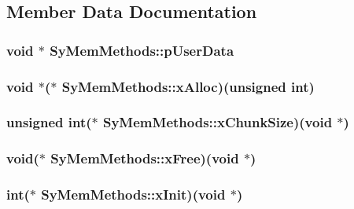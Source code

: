 \subsection{Member Data Documentation}
\hypertarget{struct_sy_mem_methods_ab71115d9f01d99699680465a58f2574b}{
\subsubsection[{p\-User\-Data}]{\setlength{\rightskip}{0pt plus 5cm}void $\ast$ Sy\-Mem\-Methods\-::p\-User\-Data}}\label{de/d5d/struct_sy_mem_methods_ab71115d9f01d99699680465a58f2574b}
\hypertarget{struct_sy_mem_methods_a0c07173c42658f654805a2b5a00fb470}{
\subsubsection[{x\-Alloc}]{\setlength{\rightskip}{0pt plus 5cm}void $\ast$($\ast$ Sy\-Mem\-Methods\-::x\-Alloc)(unsigned int)}}\label{de/d5d/struct_sy_mem_methods_a0c07173c42658f654805a2b5a00fb470}
\hypertarget{struct_sy_mem_methods_acab2915281ea3495d9b728f1f878554a}{
\subsubsection[{x\-Chunk\-Size}]{\setlength{\rightskip}{0pt plus 5cm}unsigned int($\ast$ Sy\-Mem\-Methods\-::x\-Chunk\-Size)(void $\ast$)}}\label{de/d5d/struct_sy_mem_methods_acab2915281ea3495d9b728f1f878554a}
\hypertarget{struct_sy_mem_methods_a17727c244d441b82fdef13f1f3a333cf}{
\subsubsection[{x\-Free}]{\setlength{\rightskip}{0pt plus 5cm}void($\ast$ Sy\-Mem\-Methods\-::x\-Free)(void $\ast$)}}\label{de/d5d/struct_sy_mem_methods_a17727c244d441b82fdef13f1f3a333cf}
\hypertarget{struct_sy_mem_methods_ad2026eb5051f4fafa40a9fcea747660e}{
\subsubsection[{x\-Init}]{\setlength{\rightskip}{0pt plus 5cm}int($\ast$ Sy\-Mem\-Methods\-::x\-Init)(void $\ast$)}}\label{de/d5d/struct_sy_mem_methods_ad2026eb5051f4fafa40a9fcea747660e}
